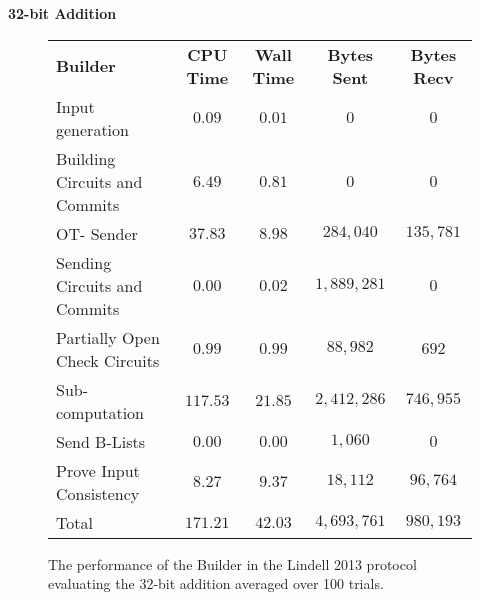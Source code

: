 \documentclass[ %
                    author={Nicholas Tutte},
                supervisor={Prof. Nigel Smart},
                    degree={MEng},
                     title={Secure Two Party Computation},
                  subtitle={A practical comparison of recent protocols},
                      type={Research - GG1K},
                      year={2015} ]{dissertation}
\begin{document}
				\FloatBarrier
				\noindent \textbf{32-bit Addition}
				\begin{figure}[!ht]
					\begin{tabular}{| p{4.3cm} | c c c c |}
						\hline
						\textbf{Builder} & \textbf{CPU Time} & \textbf{Wall Time} & \textbf{Bytes Sent} & \textbf{Bytes Recv} \\
						\thickhline
						Input generation & $0.09$ & $0.01$ & $0$ & $0$ \\
						\hline
						Building Circuits and Commits & $6.49$ & $0.81$ & $0$ & $0$ \\
						\hline
						OT- Sender & $37.83$ & $8.98$ & $284,040$ & $135,781$ \\
						\hline
						Sending Circuits and Commits & $0.00$ & $0.02$ & $1,889,281$ & $0$ \\
						\hline
						Partially Open Check Circuits & $0.99$ & $0.99$ & $88,982$ & $692$ \\
						\hline
						Sub-computation & $117.53$ & $21.85$ & $2,412,286$ & $746,955$ \\
						\hline
						Send B-Lists & $0.00$ & $0.00$ & $1,060$ & $0$ \\
						\hline
						Prove Input Consistency & $8.27$ & $9.37$ & $18,112$ & $96,764$ \\
						\thickhline
						Total & $171.21$ & $42.03$ & $4,693,761$ & $980,193$ \\
						\hline
					\end{tabular}
					\caption{The performance of the Builder in the Lindell 2013 protocol evaluating the 32-bit addition averaged over 100 trials. \label{table:L_2013_Add_Builder}}
				\end{figure}
\end{document}
